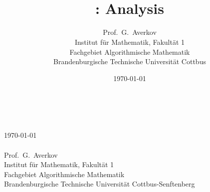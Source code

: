 

\author{Prof.~G.~Averkov\\{\small Institut für Mathematik, Fakultät 1}\\{\small Fachgebiet Algorithmische Mathematik}\\{\small Brandenburgische Technische Universität Cottbus}}
\title{\Huge{}\\ \Large{: Analysis}}
\date{\today}

\mainmatter
\thispagestyle{empty}
\begin{center}
	\Huge{}\\ \Large{}
	\\ \normalsize{\today}
	\\ {\ }
	\\ \large{Prof.~G.~Averkov} 
	\\{\small Institut für Mathematik, Fakultät 1}\\{\small Fachgebiet Algorithmische Mathematik}\\{\small Brandenburgische Technische Universität Cottbus-Senftenberg}
\end{center} 

\tableofcontents



